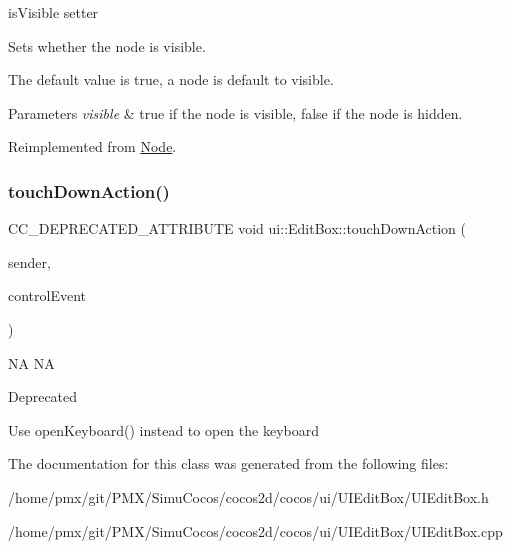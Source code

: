 is\+Visible setter 

Sets whether the node is visible.

The default value is true, a node is default to visible.


\begin{DoxyParams}{Parameters}
{\em visible} & true if the node is visible, false if the node is hidden. \\
\hline
\end{DoxyParams}


Reimplemented from \hyperlink{classNode_ad8d9f6f838941a2a8ae18420757af158}{Node}.

\mbox{\label{classui_1_1EditBox_a74da824c15ca8e40a5e70d39bc036a8a}} 
\subsubsection{\texorpdfstring{touch\+Down\+Action()}{touchDownAction()}}
{\footnotesize\ttfamily C\+C\+\_\+\+D\+E\+P\+R\+E\+C\+A\+T\+E\+D\+\_\+\+A\+T\+T\+R\+I\+B\+U\+TE void ui\+::\+Edit\+Box\+::touch\+Down\+Action (\begin{DoxyParamCaption}\item[{\hyperlink{classRef}{Ref} $\ast$}]{sender,  }\item[{\hyperlink{classui_1_1Widget_a4829c0f1cbaf1fd820a9b2ccf0c58c73}{Touch\+Event\+Type}}]{control\+Event }\end{DoxyParamCaption})}

NA  NA \begin{DoxyRefDesc}{Deprecated}
\item[\hyperlink{deprecated__deprecated000376}{Deprecated}]Use open\+Keyboard() instead to open the keyboard \end{DoxyRefDesc}


The documentation for this class was generated from the following files\+:\begin{DoxyCompactItemize}
\item 
/home/pmx/git/\+P\+M\+X/\+Simu\+Cocos/cocos2d/cocos/ui/\+U\+I\+Edit\+Box/U\+I\+Edit\+Box.\+h\item 
/home/pmx/git/\+P\+M\+X/\+Simu\+Cocos/cocos2d/cocos/ui/\+U\+I\+Edit\+Box/U\+I\+Edit\+Box.\+cpp\end{DoxyCompactItemize}
